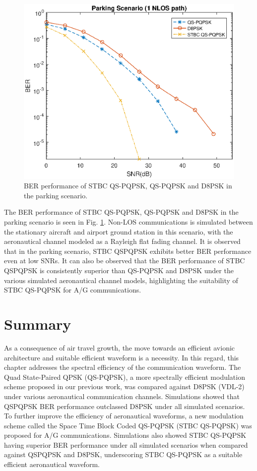 \begin{figure} []
\centering
\includegraphics [width=0.5\columnwidth]{chap3_fig/chap3_fig10.eps} 
\caption{BER performance of STBC QS-PQPSK, QS-PQPSK and D8PSK in the parking scenario.}
\label{fig:chap3_fig10}
\end{figure}

The BER performance of STBC QS-PQPSK, QS-PQPSK and D8PSK in the parking scenario is seen in Fig. \ref{fig:chap3_fig10}. Non-LOS communications is simulated between the stationary aircraft and airport ground station in this scenario, with the aeronautical channel modeled as a Rayleigh flat fading channel. It is observed that in the parking scenario, STBC QSPQPSK exhibits better BER performance even at low SNRs. It can also be observed that the BER performance of STBC QSPQPSK is consistently superior than QS-PQPSK and D8PSK under the various simulated aeronautical channel models, highlighting the suitability of STBC QS-PQPSK for A/G communications.

\section{Summary}
As a consequence of air travel growth, the move towards an efficient avionic architecture and suitable efficient waveform is a necessity. In this regard, this chapter addresses the spectral efficiency of the communication waveform. The Quad State-Paired QPSK (QS-PQPSK), a more spectrally efficient modulation scheme proposed in our previous work, was compared against D8PSK (VDL-2) under various aeronautical communication channels. Simulations showed that QSPQPSK BER performance outclassed D8PSK under all simulated scenarios. To further improve the efficiency of aeronautical waveforms, a new modulation scheme called the Space Time Block Coded QS-PQPSK (STBC QS-PQPSK) was proposed for A/G communications. Simulations also showed STBC QS-PQPSK having superior BER performance under all simulated scenarios when compared against QSPQPSK and D8PSK, underscoring STBC QS-PQPSK as a suitable efficient aeronautical waveform.







